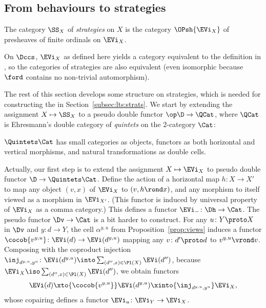 \documentclass{LMCS}
\theoremstyle{plain}\newtheorem{satz}[thm]{Satz}
\begin{document}
\subsection{From behaviours to strategies}
   \begin{defi}
     The category $\SS_X$ of \emph{strategies} on $X$ is the category
     $\OPsh{\EVi_X}$ of presheaves of finite ordinals on $\EVi_X$.
   \end{defi}
   \begin{exa}
     On $\Dccs$, $\EVi_X$ as defined here yields a category equivalent
     to the definition in , so the
     categories of strategies are also equivalent (even isomorphic
     because $\ford$ contains no non-trivial automorphism).
   \end{exa}
   The rest of this section develops some structure on strategies,
   which is needed for constructing the \lts{} in
   Section~\ref{subsec:lts:strats}. We start by extending the
   assignment $X \mapsto \SS_X$ to a pseudo double functor $\op\D \to
   \QCat$, where $\QCat$ is Ehresmann's double category of
   \emph{quintets} on the 2-category $\Cat$:
   \begin{defi}
     $\Quintets\Cat$ has small categories as objects, functors as both
     horizontal and vertical morphisms, and natural transformations as
     double cells.
   \end{defi}

   Actually, our first step is to extend the assignment $X \mapsto \EVi_X$
   to pseudo double functor $\D \to \Quintets\Cat$.  Define the action
   of a horizontal map $h \colon X \to X'$ to map any object $(v,x)$
   of $\EVi_X$ to $(v, h \rond x)$, and any morphism to itself viewed
   as a morphism in $\EVi_{X'}$. (This functor is induced by universal
   property of $\EVi_X$ as a comma category.) This defines a functor
   $\EVi_{-} \colon \Dh \to \Cat$.  The pseudo functor $\Dv \to \Cat$
   is a bit harder to construct. For any $u \colon Y \proto X$ in
   $\Dv$ and $y \colon d \to Y$, the cell $\alpha^{y,u}$ from
   Proposition~\ref{prop:views} induces a functor $\cocob{v^{y,u}}
   \colon \EVi (d) \to \EVi (d^{y,u})$ mapping any $v \colon d' \proto
   d$ to $v^{y,u} \vrond v$.  Composing with the coproduct injection
   $\inj_{d^{y,u}, y^u} \colon \EVi (d^{y,u}) \into \sum_{(d'',x) \in
     \Pl (X)} \EVi (d'')$, because $\EVi_X \iso \sum_{(d'',x) \in \Pl
     (X)} \EVi (d'')$, we obtain functors $$\EVi (d)
   \xto{\cocob{v^{y,u}}} \EVi (d^{y,u}) \xinto{\inj_{d^{y,u},y^u}}
   \EVi_X,$$ whose copairing defines a functor $\EVi_{u} \colon
   \EVi_Y \to \EVi_X$.
\end{document}

